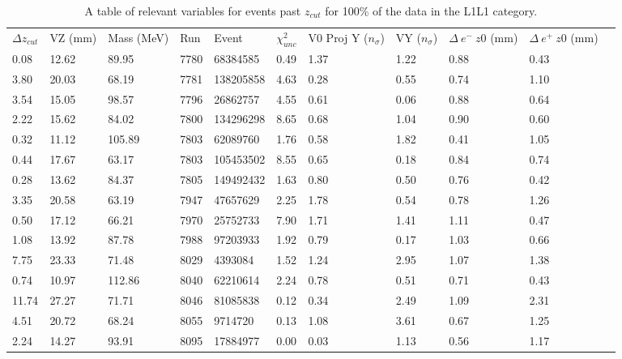 \begin{table}[t]
\centering
\tabcolsep=0.09cm
\begin{tabular}{lllllllllll}

\hline

$\Delta z_{cut}$ & VZ (mm) & Mass (MeV) & Run & Event & $\chi^2_{unc}$ & V0 Proj Y ($n_{\sigma}$) & VY ($n_{\sigma}$) & $\Delta \ e^- \ z0$ (mm) & $\Delta \ e^+ \ z0$ (mm) \\
0.08 & 12.62 & 89.95 & 7780 & 68384585 & 0.49 & 1.37 & 1.22 & 0.88 & 0.43 \\ 
3.80 & 20.03 & 68.19 & 7781 & 138205858 & 4.63 & 0.28 & 0.55 & 0.74 & 1.10 \\ 
3.54 & 15.05 & 98.57 & 7796 & 26862757 & 4.55 & 0.61 & 0.06 & 0.88 & 0.64 \\ 
2.22 & 15.62 & 84.02 & 7800 & 134296298 & 8.65 & 0.68 & 1.04 & 0.90 & 0.60 \\ 
0.32 & 11.12 & 105.89 & 7803 & 62089760 & 1.76 & 0.58 & 1.82 & 0.41 & 1.05 \\ 
0.44 & 17.67 & 63.17 & 7803 & 105453502 & 8.55 & 0.65 & 0.18 & 0.84 & 0.74 \\ 
0.28 & 13.62 & 84.37 & 7805 & 149492432 & 1.63 & 0.80 & 0.50 & 0.76 & 0.42 \\ 
3.35 & 20.58 & 63.19 & 7947 & 47657629 & 2.25 & 1.78 & 0.54 & 0.78 & 1.26 \\ 
0.50 & 17.12 & 66.21 & 7970 & 25752733 & 7.90 & 1.71 & 1.41 & 1.11 & 0.47 \\ 
1.08 & 13.92 & 87.78 & 7988 & 97203933 & 1.92 & 0.79 & 0.17 & 1.03 & 0.66 \\ 
7.75 & 23.33 & 71.48 & 8029 & 4393084 & 1.52 & 1.24 & 2.95 & 1.07 & 1.38 \\ 
0.74 & 10.97 & 112.86 & 8040 & 62210614 & 2.24 & 0.78 & 0.51 & 0.71 & 0.43 \\ 
11.74 & 27.27 & 71.71 & 8046 & 81085838 & 0.12 & 0.34 & 2.49 & 1.09 & 2.31 \\ 
4.51 & 20.72 & 68.24 & 8055 & 9714720 & 0.13 & 1.08 & 3.61 & 0.67 & 1.25 \\ 
2.24 & 14.27 & 93.91 & 8095 & 17884977 & 0.00 & 0.03 & 1.13 & 0.56 & 1.17 \\

\hline

\hline
\end{tabular}
\caption{A table of relevant variables for events past $z_{cut}$ for 100\% of the data in the L1L1 category.}
\label{tab:highZ_L1L1_unblind}
\end{table}


